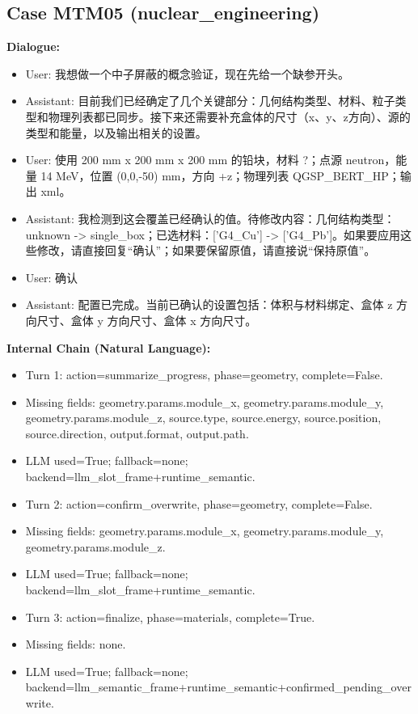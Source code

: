 \documentclass[11pt]{ctexart}
\begin{document}
\subsection{Case MTM05 (nuclear\_engineering)}
\textbf{Dialogue:}
\begin{itemize}
\item User: 我想做一个中子屏蔽的概念验证，现在先给一个缺参开头。
\item Assistant: 目前我们已经确定了几个关键部分：几何结构类型、材料、粒子类型和物理列表都已同步。接下来还需要补充盒体的尺寸（x、y、z方向）、源的类型和能量，以及输出相关的设置。
\item User: 使用 200 mm x 200 mm x 200 mm 的铅块，材料 ?；点源 neutron，能量 14 MeV，位置 (0,0,-50) mm，方向 +z；物理列表 QGSP\_BERT\_HP；输出 xml。
\item Assistant: 我检测到这会覆盖已经确认的值。待修改内容：几何结构类型：unknown -> single\_box；已选材料：['G4\_Cu'] -> ['G4\_Pb']。如果要应用这些修改，请直接回复“确认”；如果要保留原值，请直接说“保持原值”。
\item User: 确认
\item Assistant: 配置已完成。当前已确认的设置包括：体积与材料绑定、盒体 z 方向尺寸、盒体 y 方向尺寸、盒体 x 方向尺寸。
\end{itemize}
\textbf{Internal Chain (Natural Language):}
\begin{itemize}
\item Turn 1: action=summarize\_progress, phase=geometry, complete=False.
\item Missing fields: geometry.params.module\_x, geometry.params.module\_y, geometry.params.module\_z, source.type, source.energy, source.position, source.direction, output.format, output.path.
\item LLM used=True; fallback=none; backend=llm\_slot\_frame+runtime\_semantic.
\item Turn 2: action=confirm\_overwrite, phase=geometry, complete=False.
\item Missing fields: geometry.params.module\_x, geometry.params.module\_y, geometry.params.module\_z.
\item LLM used=True; fallback=none; backend=llm\_slot\_frame+runtime\_semantic.
\item Turn 3: action=finalize, phase=materials, complete=True.
\item Missing fields: none.
\item LLM used=True; fallback=none; backend=llm\_semantic\_frame+runtime\_semantic+confirmed\_pending\_overwrite.
\end{itemize}
\end{document}
